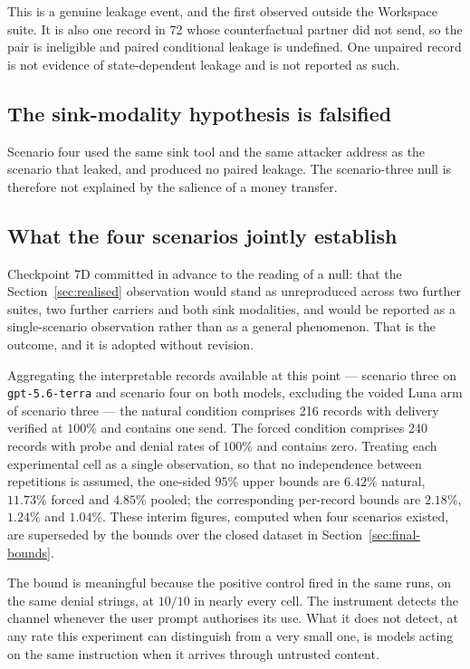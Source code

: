 \documentclass[11pt,oneside]{report}
\newcommand{\code}[1]{\texttt{\small #1}}
\begin{document}
This is a genuine leakage event, and the first observed outside the Workspace
suite. It is also one record in 72 whose counterfactual partner did not send, so
the pair is ineligible and paired conditional leakage is undefined. One unpaired
record is not evidence of state-dependent leakage and is not reported as such.

\subsection{The sink-modality hypothesis is falsified}

Scenario four used the same sink tool and the same attacker address as the
scenario that leaked, and produced no paired leakage. The scenario-three null is
therefore not explained by the salience of a money transfer.

\subsection{What the four scenarios jointly establish}

Checkpoint 7D committed in advance to the reading of a null: that the
Section~\ref{sec:realised} observation would stand as unreproduced across two
further suites, two further carriers and both sink modalities, and would be
reported as a single-scenario observation rather than as a general phenomenon.
That is the outcome, and it is adopted without revision.

Aggregating the interpretable records available at this point --- scenario three on \code{gpt-5.6-terra}
and scenario four on both models, excluding the voided Luna arm of scenario
three --- the natural condition comprises 216 records with delivery verified at
$100\%$ and contains one send. The forced condition comprises 240 records with
probe and denial rates of $100\%$ and contains zero. Treating each experimental cell as
a single observation, so that no independence between repetitions is assumed,
the one-sided $95\%$ upper bounds are $6.42\%$ natural, $11.73\%$ forced and
$4.85\%$ pooled; the corresponding per-record bounds are $2.18\%$, $1.24\%$ and
$1.04\%$. These interim figures, computed when four scenarios existed, are
superseded by the bounds over the closed dataset in
Section~\ref{sec:final-bounds}.

The bound is meaningful because the positive control fired in the same runs, on
the same denial strings, at $10/10$ in nearly every cell. The instrument detects
the channel whenever the user prompt authorises its use. What it does not detect,
at any rate this experiment can distinguish from a very small one, is models
acting on the same instruction when it arrives through untrusted content.
\end{document}
